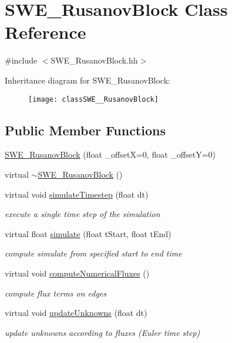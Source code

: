 \hypertarget{classSWE__RusanovBlock}{\section{S\-W\-E\-\_\-\-Rusanov\-Block Class Reference}
\label{classSWE__RusanovBlock}
}


{\ttfamily \#include $<$S\-W\-E\-\_\-\-Rusanov\-Block.\-hh$>$}

Inheritance diagram for S\-W\-E\-\_\-\-Rusanov\-Block\-:\begin{figure}[H]
\begin{center}
\leavevmode
\texttt{[image: classSWE\_\_RusanovBlock]}
\end{center}
\end{figure}
\subsection*{Public Member Functions}
\begin{DoxyCompactItemize}
\item 
\hyperlink{classSWE__RusanovBlock_a479a282899300076c44ccabcb42b5b5c}{S\-W\-E\-\_\-\-Rusanov\-Block} (float \-\_\-offset\-X=0, float \-\_\-offset\-Y=0)
\item 
virtual \hyperlink{classSWE__RusanovBlock_aab12f79b94c8ac3cc541ceb2814f72d4}{$\sim$\-S\-W\-E\-\_\-\-Rusanov\-Block} ()
\item 
virtual void \hyperlink{classSWE__RusanovBlock_ada062db4f54700011d50378b0045830a}{simulate\-Timestep} (float dt)
\begin{DoxyCompactList}\small\item\em execute a single time step of the simulation \end{DoxyCompactList}\item 
virtual float \hyperlink{classSWE__RusanovBlock_a645322106b3e5b6f0cca077611ad2159}{simulate} (float t\-Start, float t\-End)
\begin{DoxyCompactList}\small\item\em compute simulate from specified start to end time \end{DoxyCompactList}\item 
virtual void \hyperlink{classSWE__RusanovBlock_a78cdefa510cd2d88ca4e213f75b9b10b}{compute\-Numerical\-Fluxes} ()
\begin{DoxyCompactList}\small\item\em compute flux terms on edges \end{DoxyCompactList}\item 
virtual void \hyperlink{classSWE__RusanovBlock_a2980aa21030ba8fc607001ad817d7454}{update\-Unknowns} (float dt)
\begin{DoxyCompactList}\small\item\em update unknowns according to fluxes (Euler time step) \end{DoxyCompactList}\end{DoxyCompactItemize}

